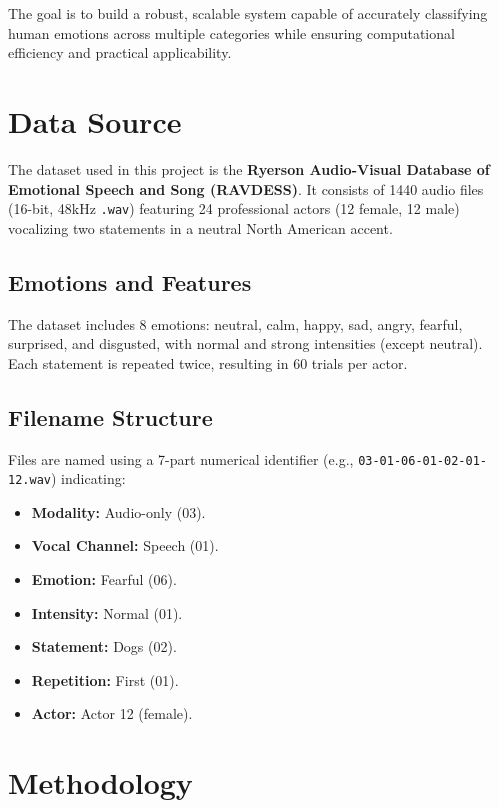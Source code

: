 \documentclass{article}
\begin{document}
The goal is to build a robust, scalable system capable of accurately classifying human emotions across multiple 
categories while ensuring computational efficiency and practical applicability.

\section{Data Source}

The dataset used in this project is the \textbf{Ryerson Audio-Visual Database of Emotional Speech and Song (RAVDESS)}. 
It consists of 1440 audio files (16-bit, 48kHz \texttt{.wav}) featuring 24 professional actors (12 female, 12 male) 
vocalizing two statements in a neutral North American accent. 

\subsection{Emotions and Features}
The dataset includes 8 emotions: neutral, calm, happy, sad, angry, fearful, surprised, and disgusted, with normal and 
strong intensities (except neutral). Each statement is repeated twice, resulting in 60 trials per actor.

\subsection{Filename Structure}
Files are named using a 7-part numerical identifier (e.g., \texttt{03-01-06-01-02-01-12.wav}) indicating:
\begin{itemize}
    \item \textbf{Modality:} Audio-only (03).
    \item \textbf{Vocal Channel:} Speech (01).
    \item \textbf{Emotion:} Fearful (06).
    \item \textbf{Intensity:} Normal (01).
    \item \textbf{Statement:} Dogs (02).
    \item \textbf{Repetition:} First (01).
    \item \textbf{Actor:} Actor 12 (female).
\end{itemize}

\section{Methodology}
\end{document}
